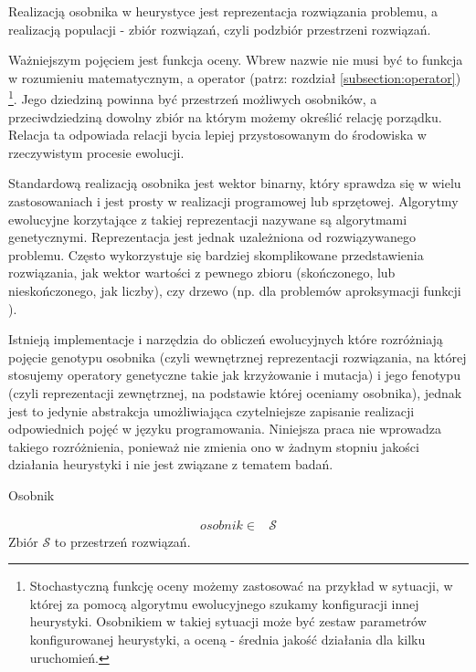 \documentclass[twoside]{iisthesis}
\newcommand{\important}{\mathcal}
\begin{document}
Realizacją osobnika w heurystyce jest reprezentacja rozwiązania problemu, a realizacją populacji - zbiór rozwiązań, czyli podzbiór przestrzeni rozwiązań.

Ważniejszym pojęciem jest funkcja oceny. Wbrew nazwie nie musi być to funkcja w rozumieniu matematycznym, a operator (patrz: rozdział \ref{subsection:operator}) \footnote{Stochastyczną funkcję oceny możemy zastosować na przykład w sytuacji, w której za pomocą algorytmu ewolucyjnego szukamy konfiguracji innej heurystyki. Osobnikiem w takiej sytuacji może być zestaw parametrów konfigurowanej heurystyki, a oceną - średnia jakość działania dla kilku uruchomień.}. Jego dziedziną powinna być przestrzeń możliwych osobników, a przeciwdziedziną dowolny zbiór na którym możemy określić relację porządku. Relacja ta odpowiada relacji bycia lepiej przystosowanym do środowiska w rzeczywistym procesie ewolucji.

Standardową realizacją osobnika jest wektor binarny, który sprawdza się w wielu zastosowaniach i jest prosty w realizacji programowej lub sprzętowej. Algorytmy ewolucyjne korzytające z takiej reprezentacji nazywane są algorytmami genetycznymi. Reprezentacja jest jednak uzależniona od rozwiązywanego problemu. Często wykorzystuje się bardziej skomplikowane przedstawienia rozwiązania, jak wektor wartości z pewnego zbioru (skończonego, lub nieskończonego, jak liczby), czy drzewo \cite{gen_prog} (np. dla problemów aproksymacji funkcji \cite{gen_prog_foo_approx}).

Istnieją implementacje i narzędzia do obliczeń ewolucyjnych które rozróżniają pojęcie genotypu osobnika (czyli wewnętrznej reprezentacji rozwiązania, na której stosujemy operatory genetyczne takie jak krzyżowanie i mutacja) i jego fenotypu (czyli reprezentacji zewnętrznej, na podstawie której oceniamy osobnika), jednak jest to jedynie abstrakcja umożliwiająca czytelniejsze zapisanie realizacji odpowiednich pojęć w języku programowania. Niniejsza praca nie wprowadza takiego rozróżnienia, ponieważ nie zmienia ono w żadnym stopniu jakości działania heurystyki i nie jest związane z tematem badań.

\begin{signature}
	\caption{Osobnik \label{signature:specimen}}
	\begin{align}
	osobnik \in &\important{S}
	\end{align}
	Zbiór $\important{S}$ to przestrzeń rozwiązań.
\end{signature}
\end{document}
